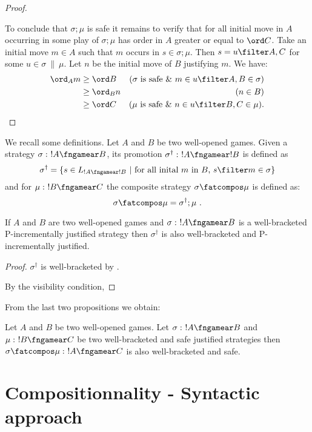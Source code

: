\begin{proof}
\begin{enumerate}[(1)]
\begin{enumerate}
\end{enumerate} 
\end{enumerate} 
To conclude that $\sigma;\mu$ is safe it remains to verify that for all initial move in $A$ occurring in some play of $\sigma ; \mu$ has order in $A$ greater or equal to $\ord C$.
Take an initial move $m \in A$ such that $m$ occurs in $s \in \sigma ; \mu$. Then $s = u \filter A,C$ for some $u \in \sigma 
\ \|\ \mu$. Let $n$ be the initial move of $B$ justifying $m$.
 We have:
\begin{align*}
\ord_A m & \geq \ord B & \mbox{($\sigma$ is safe \& $m \in u
\filter A,B \in \sigma$)} \\
 & \geq \ord_B n & \mbox{($n 
\in B$)} \\
 & \geq \ord C & \mbox{($\mu$ is safe \& $n \in u
\filter B,C \in \mu$)}.
\end{align*}
\end{proof}
We recall some definitions. Let $A$ and $B$ be two well-opened games. Given a strategy  $\sigma :\ !A \fngamear B$, its promotion $\sigma^\dag :\ !A\fngamear !B$ is defined as
$$ \sigma^\dag = \{ s \in L_{!A\fngamear !B}\ |\ \mbox{for all inital $m$ in $B$, } s\filter m \in \sigma \}$$
and for $\mu :\ !B\fngamear C$ the composite strategy $\sigma \fatcompos \mu$ is defined as:
$$ \sigma \fatcompos \mu = \sigma^\dag ; \mu \ .$$

\begin{proposition}
If $A$ and $B$ are two well-opened games 
and $\sigma :\ !A \fngamear B$ is a well-bracketed P-incrementally justified strategy then $\sigma^\dag$ is also well-bracketed and P-incrementally justified.
\end{proposition}
\begin{proof}
$\sigma^\dag$ is well-bracketed by \cite[Proposition 2.10.]{abramsky94full}.

By the visibility condition,
\end{proof}

From the last two propositions we obtain:
\begin{corollary}
Let $A$ and $B$ be two well-opened games. Let
$\sigma :\ !A \fngamear B$ and $\mu :\ !B\fngamear C$ be two well-bracketed and safe justified strategies then $\sigma \fatcompos \mu :\ !A \fngamear C$ is also well-bracketed and safe.
\end{corollary}

\section{Compositionnality - Syntactic approach}

